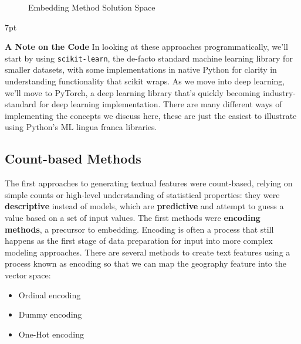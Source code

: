 \documentclass[11pt, table]{diazessay} %
\newenvironment{formal}{%
  \def\FrameCommand{%
    \hspace{1pt}%
    {\color{w_lightblue}\vrule width 2pt}%
    {\color{formalshade}\vrule width 4pt}%
    \colorbox{formalshade}%
  }%
  \MakeFramed{\advance\hsize-\width\FrameRestore}%
  \noindent\hspace{-4.55pt}%
  \begin{adjustwidth}{}{7pt}%
  \vspace{2pt}\vspace{2pt}%
}
{%
  \vspace{2pt}\end{adjustwidth}\endMakeFramed%
}
\begin{document}
\begin{sloppypar}
\begin{figure}[H]
    \centering
     \caption{Embedding Method Solution Space}
\end{figure}

\begin{formal}
\textbf{A Note on the Code}
In looking at these approaches programmatically, we'll start by using \texttt{scikit-learn}, the de-facto standard machine learning library for smaller datasets, with some implementations in native Python for clarity in understanding functionality that scikit wraps.  As we move into deep learning, we'll move to PyTorch, a deep learning library that's quickly becoming industry-standard for deep learning implementation. There are many different ways of implementing the concepts we discuss here, these are just the easiest to illustrate using Python's ML lingua franca libraries. 
\end{formal}

\subsection{Count-based Methods}

The first approaches to generating textual features were count-based, relying on simple counts or high-level understanding of statistical properties: they were \textbf{descriptive} instead of models, which are \textbf{predictive} and attempt to guess a value based on a set of input values.  The first methods were \textbf{encoding methods}, a precursor to embedding. Encoding is often a process that still happens as the first stage of data preparation for input into more complex modeling approaches.  There are several methods to create text features using a process known as encoding so that we can map the geography feature into the vector space:

\begin{itemize}
  \item Ordinal encoding   
  \item Dummy encoding 
  \item One-Hot encoding
\end{itemize}


\end{sloppypar}
\end{document}
